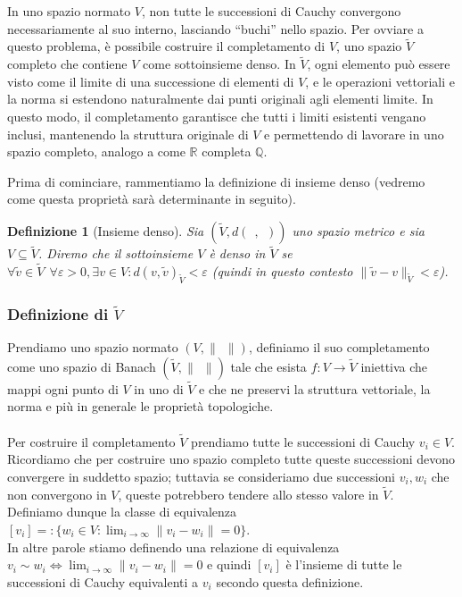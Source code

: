 \documentclass[a4paper,12pt]{report}
\newtheorem{definizione}{Definizione}[chapter]
\newcommand{\lt}{<}
\newcommand{\gt}{>}
\begin{document}
In uno spazio normato $V$, non tutte le successioni di Cauchy convergono necessariamente al suo interno, lasciando “buchi” nello spazio. Per ovviare a questo problema, è possibile costruire il completamento di $V$, uno spazio $\tilde{V}$ completo che contiene $V$ come sottoinsieme denso. In $\tilde{V}$, ogni elemento può essere visto come il limite di una successione di elementi di $V$, e le operazioni vettoriali e la norma si estendono naturalmente dai punti originali agli elementi limite. In questo modo, il completamento garantisce che tutti i limiti esistenti vengano inclusi, mantenendo la struttura originale di $V$ e permettendo di lavorare in uno spazio completo, analogo a come $\mathbb{R}$ completa $\mathbb{Q}$.

Prima di cominciare, rammentiamo la definizione di insieme denso (vedremo come questa proprietà sarà determinante in seguito).

\begin{definizione}[Insieme denso]\label{def: 2.9}
    Sia $(\tilde{V}, d(\ \ ,\ \ ))$ uno spazio metrico e sia $V \subseteq \tilde{V}$. Diremo che il sottoinsieme $V$ è denso in $\tilde{V}$ se $\forall \tilde{v} \in \tilde{V} \ \ \forall\varepsilon \gt0, \exists v \in V: d(v,\tilde{v})_{\tilde{V}} \lt \varepsilon$ (quindi in questo contesto $\|\tilde{v}-v\|_{\tilde{V}}\lt \varepsilon$).
\end{definizione}

\subsubsection{Definizione di $\tilde{V}$}

Prendiamo uno spazio normato $(V, \| \ \ \|)$, definiamo il suo completamento come uno spazio di Banach $(\tilde{V}, \| \ \ \|)$ tale che esista $f:V \to \tilde{V}$ iniettiva che mappi ogni punto di $V$ in uno di $\tilde{V}$ e che ne preservi la struttura vettoriale, la norma e più in generale le proprietà topologiche. 
\\
\\ Per costruire il completamento $\tilde{V}$ prendiamo tutte le successioni di Cauchy $v_i \in V$. Ricordiamo che per costruire uno spazio completo tutte queste successioni devono convergere in suddetto spazio; tuttavia se consideriamo due successioni $v_i, w_i$ che non convergono in $V$, queste potrebbero tendere allo stesso valore in $\tilde{V}$. 
\\ Definiamo dunque la classe di equivalenza $[v_i]=:\big\{w_i \in V: \displaystyle\lim_{i \to \infty}\|v_i-w_i\|=0\big\}$.
\\ In altre parole stiamo definendo una relazione di equivalenza \mbox{$v_i \sim w_i \iff\displaystyle\lim_{i\to \infty}\|v_i-w_i\|=0$} e quindi $[v_i]$ è l'insieme di tutte le successioni di Cauchy equivalenti a $v_i$ secondo questa definizione.
\end{document}
